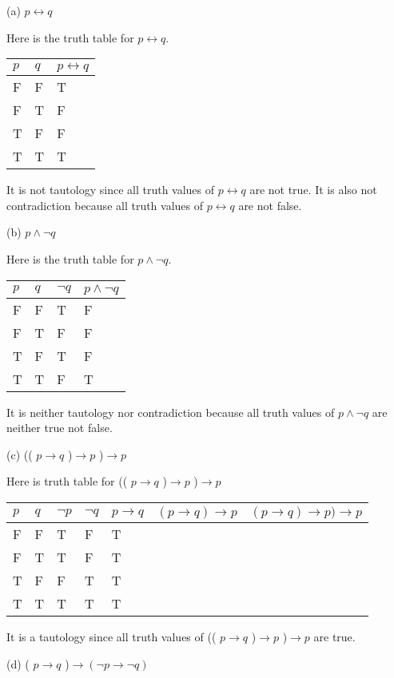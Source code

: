 \documentclass{article}
\begin{document}
(a) $p \leftrightarrow q$

Here is the truth table for $p\leftrightarrow q$.

\begin{tabular}{ll|l}
  $p$ & $q$ & $p\leftrightarrow q$\\
  \hline
  F & F & T \\
  F & T & F \\
  T & F & F \\
  T & T & T
\end{tabular}

It is not tautology since all truth values of $p\leftrightarrow q$ are not true. It is also not contradiction because all truth values of $p\leftrightarrow q$ are not false. 



(b) $p \wedge \neg q$

Here is the truth table for $p \wedge \neg q$.

\begin{tabular}{ll|l|l}
  $p$ & $q$ & $\neg q$ & $p \wedge \neg q$\\
  \hline 
  F & F & T & F \\
  F & T & F & F \\
  T & F & T & F \\
  T & T & F & T
\end{tabular}

It is neither tautology nor contradiction because all truth values of $p \wedge \neg q$ are neither true not false.

(c) (( $p \rightarrow q$ )$ \rightarrow p$ )$ \rightarrow p$
 
 Here is truth table for (( $p \rightarrow q$ )$ \rightarrow p$ )$ \rightarrow p$

\begin{tabular}{ll|l|l|l|l|l}
  $p$ & $q$ & $\neg p$ & $\neg q$ & $p \rightarrow q$ & $( p \rightarrow q ) \rightarrow p$ & $( p \rightarrow q ) \rightarrow p ) \rightarrow p$ \\
  \hline
  F & F & T & F & T \\
  F & T & T & F & T\\
  T & F & F & T & T\\
  T & T & T & T & T
  
\end{tabular}
  
  It is a tautology since all truth values of (( $p \rightarrow q$ )$ \rightarrow p$ )$ \rightarrow p$ are true. 

(d) ( $p \rightarrow q$ )$ \rightarrow (\neg p \rightarrow \neg q )$
\end{document}
